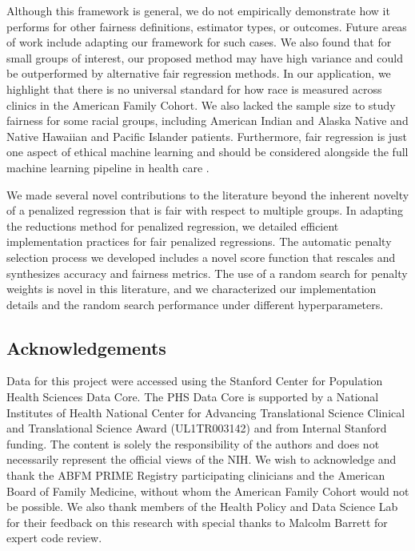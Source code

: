 \documentclass[
  12pt]{article}
\begin{document}
Although this framework is general, we do not empirically demonstrate
how it performs for other fairness definitions, estimator types, or
outcomes. Future areas of work include adapting our framework for such
cases. We also found that for small groups of interest, our proposed
method may have high variance and could be outperformed by alternative
fair regression methods. In our application, we highlight that there is
no universal standard for how race is measured across clinics in the
American Family Cohort. We also lacked the sample size to study fairness
for some racial groups, including American Indian and Alaska Native and
Native Hawaiian and Pacific Islander patients. Furthermore, fair
regression is just one aspect of ethical machine learning and should be
considered alongside the full machine learning pipeline in health care
\citep{chen_ethical_2021}.

We made several novel contributions to the literature beyond the
inherent novelty of a penalized regression that is fair with respect to
multiple groups. In adapting the reductions method for penalized
regression, we detailed efficient implementation practices for fair
penalized regressions. The automatic penalty selection process we
developed includes a novel score function that rescales and synthesizes
accuracy and fairness metrics. The use of a random search for penalty
weights is novel in this literature, and we characterized our
implementation details and the random search performance under different
hyperparameters.

\subsection*{Acknowledgements}\label{acknowledgements}

Data for this project were accessed using the Stanford Center for
Population Health Sciences Data Core. The PHS Data Core is supported by
a National Institutes of Health National Center for Advancing
Translational Science Clinical and Translational Science Award
(UL1TR003142) and from Internal Stanford funding. The content is solely
the responsibility of the authors and does not necessarily represent the
official views of the NIH. We wish to acknowledge and thank the ABFM
PRIME Registry participating clinicians and the American Board of Family
Medicine, without whom the American Family Cohort would not be possible.
We also thank members of the Health Policy and Data Science Lab for
their feedback on this research with special thanks to Malcolm Barrett
for expert code review.
\end{document}
